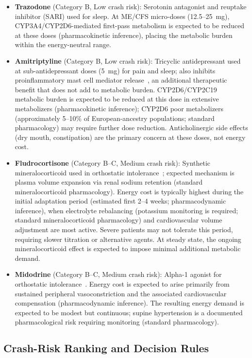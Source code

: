 \begin{itemize}
    \item \textbf{Trazodone} (Category B, Low crash risk): Serotonin antagonist and reuptake inhibitor (SARI) used for sleep. At ME/CFS micro-doses (12.5--25~mg), CYP3A4/CYP2D6-mediated first-pass metabolism is expected to be reduced at these doses (pharmacokinetic inference), placing the metabolic burden within the energy-neutral range.
    \item \textbf{Amitriptyline} (Category B, Low crash risk): Tricyclic antidepressant used at sub-antidepressant doses (5~mg) for pain and sleep; also inhibits proinflammatory mast cell mediator release~\cite{Clemons2011}, an additional therapeutic benefit that does not add to metabolic burden. CYP2D6/CYP2C19 metabolic burden is expected to be reduced at this dose in extensive metabolizers (pharmacokinetic inference); CYP2D6 poor metabolizers (approximately 5--10\% of European-ancestry populations; standard pharmacology) may require further dose reduction. Anticholinergic side effects (dry mouth, constipation) are the primary concern at these doses, not energy cost.
    \item \textbf{Fludrocortisone} (Category B--C, Medium crash risk): Synthetic mineralocorticoid used in orthostatic intolerance~\cite{Freitas2000Bisoprolol,Ojha2024pediatricPOTS}; expected mechanism is plasma volume expansion via renal sodium retention (standard mineralocorticoid pharmacology). Energy cost is typically highest during the initial adaptation period (estimated first 2--4 weeks; pharmacodynamic inference), when electrolyte rebalancing (potassium monitoring is required; standard mineralocorticoid pharmacology) and cardiovascular volume adjustment are most active. Severe patients may not tolerate this period, requiring slower titration or alternative agents. At steady state, the ongoing mineralocorticoid effect is expected to impose minimal additional metabolic demand.
    \item \textbf{Midodrine} (Category B--C, Medium crash risk): Alpha-1 agonist for orthostatic intolerance~\cite{Ojha2024pediatricPOTS}. Energy cost is expected to arise primarily from sustained peripheral vasoconstriction and the associated cardiovascular compensation (pharmacodynamic inference). The resulting energy demand is expected to be modest but continuous; supine hypertension is a documented pharmacological risk requiring monitoring (standard pharmacology).
\end{itemize}

\subsection{Crash-Risk Ranking and Decision Rules}
\label{subsec:crash-risk}

